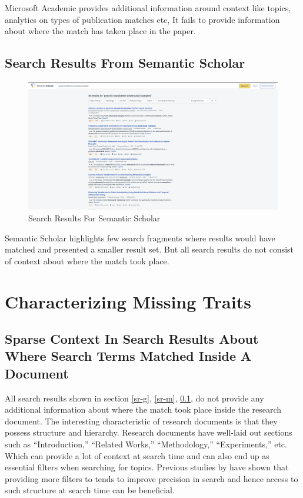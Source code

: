 Microsoft Academic provides additional information around context like topics, analytics on types of publication matches etc,
It fails to provide information about where the match has taken place in the paper.

\pagebreak
\subsection{Search Results From Semantic Scholar}
\label{sr-s}
\begin{figure}[h]
    \centering
    \includegraphics[width=\maxwidth{\textwidth}]{src/images/ss-example.png}
    \caption{Search Results For Semantic Scholar}
    \label{figure\arabic{figurecounter}}
\end{figure}
Semantic Scholar highlights few search fragments where results would have matched and presented a smaller result set. 
But all search results do not consist of context about where the match took place. 

\pagebreak
\section{Characterizing Missing Traits}
\label{section:intro:missing_traits}

\subsection{Sparse Context In Search Results About Where Search Terms Matched Inside A Document}

All search results shown in section \ref{sr-g}, \ref{sr-m}, \ref{sr-s}, do not provide any additional 
information about where the match took place inside the research document. The interesting characteristic of research documents is that they 
possess structure and hierarchy. Research documents have well-laid out sections such as “Introduction,” “Related Works,” “Methodology,” “Experiments,” etc. 
Which can provide a lot of context at search time and can also end up as essential filters when searching for topics. 
Previous studies by \parencite{kacem2018analysis} have shown that providing more filters to tends to improve 
precision in search and hence access to such structure at search time can be beneficial. 
\pagebreak

